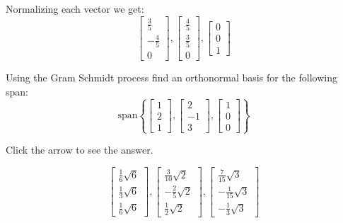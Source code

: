 \documentclass{ximera}
\begin{document}
\begin{problem}
\begin{expandable}
Normalizing each vector we get:
\[
\left[
\begin{array}{c}
\frac{3}{5} \\
-\frac{4}{5} \\
0
\end{array}
\right] ,\left[
\begin{array}{c}
\frac{4}{5} \\
\frac{3}{5} \\
0
\end{array}
\right] ,\left[
\begin{array}{c}
0 \\
0 \\
1
\end{array}
\right]
\]
\end{expandable}
\end{problem}

\begin{problem}\label{prob:use_GS_on_span}
Using the Gram Schmidt process find an
orthonormal basis for the following span:
 \[
\mbox{span} \left\{ \left[
\begin{array}{r}
1 \\
2 \\
1
\end{array}
\right] ,\left[
\begin{array}{r}
2 \\
-1 \\
3
\end{array}
\right] , \left[
\begin{array}{r}
1 \\
0 \\
0
\end{array}
\right] \right\}
\]

Click the arrow to see the answer.
\begin{expandable}
\[
\left[
\begin{array}{c}
\frac{1}{6}\sqrt{6} \\
\frac{1}{3}\sqrt{6} \\
\frac{1}{6}\sqrt{6}
\end{array}
\right] ,\left[
\begin{array}{c}
\frac{3}{10}\sqrt{2} \\
-\frac{2}{5}\sqrt{2} \\
\frac{1}{2}\sqrt{2}
\end{array}
\right] ,\left[
\begin{array}{c}
\frac{7}{15}\sqrt{3} \\
-\frac{1}{15}\sqrt{3} \\
-\frac{1}{3}\sqrt{3}
\end{array}
\right]
\]
\end{expandable}
\end{problem}
\end{document}

